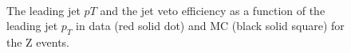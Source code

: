 \begin{figure}[!hbtp]
\centering
{}
 \\
\caption{The leading jet $pT$  and the jet veto efficiency as a function 
of the leading jet $p_T$  in data (red solid dot) and MC (black solid square) for the Z events. }
\label{fig:jetveto_z}
\end{figure}

